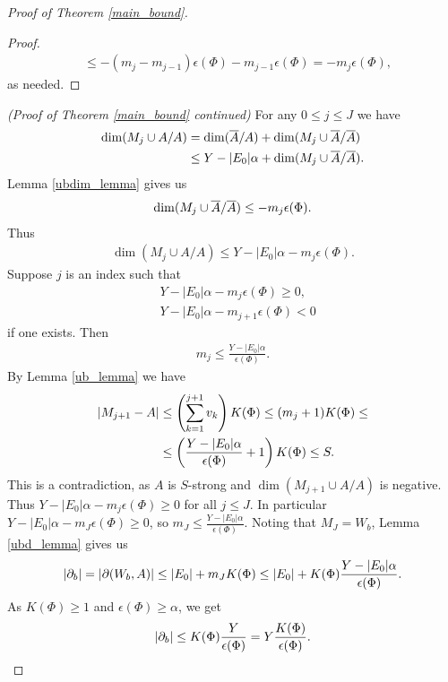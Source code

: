 \begin{proof} [Proof of Theorem \ref{main_bound}]
\begin{proof}
\begin{align*}
      &\leq  -(m_j - m_{j-1})\epsilon(\Phi) - m_{j-1}  \epsilon(\Phi) =  - m_j  \epsilon(\Phi),
    \end{align*}
    as needed.
  \end{proof}
  \textit{(Proof of Theorem \ref{main_bound} continued)}
  For any $0 \leq j \leq J$ we have
  \begin{align*}
    \dim(M_j \cup A / A) &= \dim(\overline{A} / A) + \dim(M_j \cup \overline{A} / \overline{A}) \\
    &\leq Y - |E_0|\alpha + \dim(M_j \cup \overline{A} / \overline{A}).
  \end{align*}
  Lemma \ref{ubdim_lemma} gives us
  \begin{align*}
    \dim(M_j \cup \overline{A} / \overline{A}) \leq -m_j  \epsilon(\Phi).
  \end{align*}
  Thus
  \begin{align*}
    \dim(M_j \cup A / A) \leq Y - |E_0| \alpha - m_j  \epsilon(\Phi).
  \end{align*}
  Suppose $j$ is an index such that
  \begin{align*}
    &Y - |E_0| \alpha - m_j  \epsilon(\Phi) \geq 0, \\
    &Y - |E_0| \alpha - m_{j+1}  \epsilon(\Phi) < 0
  \end{align*}
  if one exists.
  Then 
  \begin{align*}
    m_j \leq \frac{Y - |E_0| \alpha}{\epsilon(\Phi)}.
  \end{align*}
  By Lemma \ref{ub_lemma} we have
  \begin{align*}
    \left|M_{j+1} - A\right| &\leq \left(\sum_{k=1}^{j+1} v_{k}\right) K(\Phi) \leq (m_j + 1) K(\Phi) \leq \\
                     &\leq \left(\frac{Y - |E_0| \alpha}{\epsilon(\Phi)} + 1\right) K(\Phi) \leq S.
  \end{align*}
  This is a contradiction, as $A$ is $S$-strong and $\dim(M_{j+1} \cup A / A)$ is negative.
  Thus $Y - |E_0| \alpha - m_j  \epsilon(\Phi) \geq 0$ for all $j \leq J$.
  In particular $Y - |E_0| \alpha - m_J  \epsilon(\Phi) \geq 0$, so $m_J \leq \frac{Y - |E_0| \alpha}{\epsilon(\Phi)}$.
  Noting that $M_J = W_b$, Lemma \ref{ubd_lemma} gives us 
  \begin{align*}
      |\partial_b| = |\partial(W_b, A)| \leq |E_0| + m_J  K(\Phi) \leq |E_0| + K(\Phi) \frac{Y - |E_0| \alpha}{\epsilon(\Phi)}.
  \end{align*}
  As $K(\Phi) \geq 1$ and $\epsilon(\Phi) \geq \alpha$, we get
  \begin{align*}
      |\ppp_b| \leq K(\Phi) \frac{Y}{\epsilon(\Phi)} = Y \frac{K(\Phi)}{\epsilon(\Phi)}.

\end{align*}
\end{proof}
